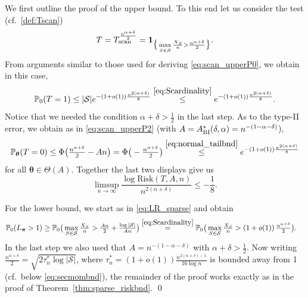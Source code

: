 \documentclass[11pt,reqno,letterpaper]{amsart}
\numberwithin{equation}{section}
\theoremstyle{plain}
\def \btheta{\boldsymbol{\theta}}
\def \bpi{\boldsymbol{\pi}}
\def \P{\mathbb{P}}
\begin{document}
 We first 
outline the proof of the upper bound. To this end let us consider the test 
(cf.~\eqref{def:Tscan})
\begin{equation*}%
T =  T_{{\rm scan}}^{\frac{n^{\alpha + \delta}}{2}} = \mathbf{1}_{\big\{\max\limits_{S\in 
\mathcal{S}}\frac{X_{S}}{n} > \frac{n^{\alpha + \delta}}{2}\big\}}.
\end{equation*}
From arguments similar to those used for deriving \eqref{eq:scan_upperP0}, we 
obtain in this case,
\begin{equation*}%
\P_0(T = 1) \le |\mathcal S| e^{-(1 + o(1)) \frac{n^{2(\alpha + \delta)}}{8}} \stackrel{\eqref{eq:Scardinality}}{\le} e^{-(1 + o(1)) \frac{n^{2(\alpha + \delta)}}{8}}.
\end{equation*}
Notice that we needed the condition $\alpha + \delta > \frac12$ in the last step. 
As to the type-II error, we obtain as in \eqref{eq:scan_upperP2} (with $A = A^{\ast}_{{\rm BI}}(\delta, \alpha) = n^{-(1 - \alpha - \delta)}$),
\begin{equation*}
\P_{\btheta}(T = 0) \le \Phi\big(\tfrac{n^{\alpha + \delta}}{2} - A n\big) = \Phi\big(-\tfrac{n^{\alpha + \delta}}{2}\big) \stackrel{\eqref{eq:normal_tailbnd}}{\le} e^{-(1 + o(1)) \frac{n^{2(\alpha + \delta)}}{8}}
\end{equation*}
for all $\btheta \in \Theta(A)$. Together the last two displays give us
\begin{equation*}%
\limsup_{n\rightarrow \infty}\frac{\log{\mathrm{Risk}(T,A,n)}}{n^{2(\alpha + \delta)}} \le  - \frac18.
\end{equation*}

\smallskip

For the lower bound, we start as in \eqref{eq:LR_sparse} and obtain
\begin{equation*}
\begin{split}
\P_0(L_{\bpi}>1) &\ge \P_0\big(\max\limits_{S\in \mathcal{S}} \tfrac{X_S}{n} > \tfrac{An}{2} + \tfrac{\log{|\mathcal{S}|}}{An}\big) \stackrel{\eqref{eq:Scardinality}}{=} \P_0\big(\max\limits_{S\in \mathcal{S}} \tfrac{X_S}{n} > (1 + o(1)) \, \tfrac{n^{\alpha + \delta}}2 \big).
\end{split}  
\end{equation*}
In the last step we also used that $A = n^{-(1 - \alpha - \delta)}$ with 
$\alpha + \delta > \frac12$. Now writing $\tfrac{n^{\alpha + \delta}}2 = \sqrt{2\tau_n^\ast \log |\mathcal S|}$, where $\tau_n^\ast = (1 + o(1)) \tfrac{n^{2(\alpha + \delta) - 1}}{16 \log n}$ is bounded away from 1 (cf.~below \eqref{eq:secmombnd}), the remainder of the proof works exactly as in 
the proof of Theorem~\ref{thm:sparse_riskbnd}.
\qed
\end{document}
